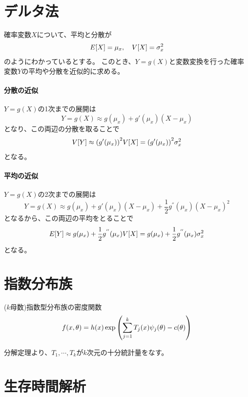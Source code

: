 \section{デルタ法}

確率変数\(X\)について、平均と分散が
\begin{equation}
  E \qty[X] = \mu_{x}, \quad V \qty[X] = \sigma_{x}^2
\end{equation}
のようにわかっているとする。
このとき、\(Y = g(X)\)と変数変換を行った確率変数\(Y\)の平均や分散を近似的に求める。

\paragraph{分散の近似}
\(Y = g(X)\)の1次までの展開は
\begin{equation}
  Y = g(X) \approx g(\mu_{x}) + g'(\mu_{x})  (X - \mu_{x})
\end{equation}
となり、この両辺の分散を取ることで
\begin{equation}
  V[Y] \approx \qty (g'(\mu_{x}))^2 V \qty[X] = \qty (g'(\mu_{x}))^2 \sigma_{x}^2
\end{equation}
となる。

\paragraph{平均の近似}
\(Y = g(X)\)の2次までの展開は
\begin{equation}
  Y = g(X) \approx g(\mu_{x}) + g'(\mu_{x})  (X - \mu_{x}) 
  + \frac{1}{2} g^{''}(\mu_{x}) (X - \mu_{x})^2
\end{equation}
となるから、この両辺の平均をとることで
\begin{equation}
  E \qty[Y] \approx g(\mu_{x}) + \frac{1}{2} g^{''}(\mu_{x}) V \qty[X]
  = g(\mu_{x}) + \frac{1}{2} g^{''}(\mu_{x}) \sigma_{x}^2
\end{equation}
となる。
\section{指数分布族}
 
 (\(k\)母数)指数型分布族の密度関数
\begin{equation}
  f (x, \theta) = h(x) \exp \qty ( \sum_{j=1}^{k} T_j(x)\psi_{j}(\theta) - c(\theta))
\end{equation}

分解定理より、\(T_1, \cdots, T_k\)が\(k\)次元の十分統計量をなす。


\section{生存時間解析}

